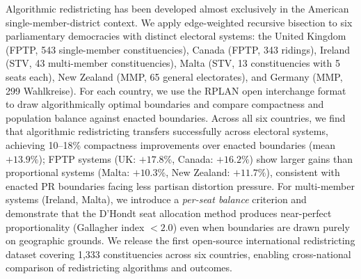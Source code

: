 Algorithmic redistricting has been developed almost exclusively in the American single-member-district context. We apply edge-weighted recursive bisection to six parliamentary democracies with distinct electoral systems: the United Kingdom (FPTP, 543 single-member constituencies), Canada (FPTP, 343 ridings), Ireland (STV, 43 multi-member constituencies), Malta (STV, 13 constituencies with 5 seats each), New Zealand (MMP, 65 general electorates), and Germany (MMP, 299 Wahlkreise). For each country, we use the RPLAN open interchange format to draw algorithmically optimal boundaries and compare compactness and population balance against enacted boundaries. Across all six countries, we find that algorithmic redistricting transfers successfully across electoral systems, achieving 10--18\% compactness improvements over enacted boundaries (mean $+13.9\%$); FPTP systems (UK: $+17.8\%$, Canada: $+16.2\%$) show larger gains than proportional systems (Malta: $+10.3\%$, New Zealand: $+11.7\%$), consistent with enacted PR boundaries facing less partisan distortion pressure. For multi-member systems (Ireland, Malta), we introduce a \emph{per-seat balance} criterion and demonstrate that the D'Hondt seat allocation method produces near-perfect proportionality (Gallagher index $< 2.0$) even when boundaries are drawn purely on geographic grounds. We release the first open-source international redistricting dataset covering 1,333 constituencies across six countries, enabling cross-national comparison of redistricting algorithms and outcomes.

